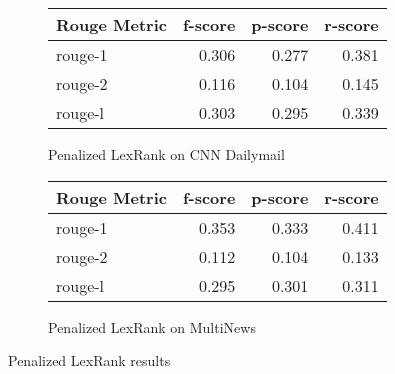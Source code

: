 \documentclass[../writeup.tex]{subfiles}
\begin{document}
\begin{figure}[H]
    \centering
    \begin{subfigure}{0.5\linewidth}
        \begin{tabular}{lrrr}
            \hline
            Rouge Metric & f-score & p-score & r-score \\
            \hline
            rouge-1      & 0.306   & 0.277   & 0.381   \\
            rouge-2      & 0.116   & 0.104   & 0.145   \\
            rouge-l      & 0.303   & 0.295   & 0.339   \\
            \hline
        \end{tabular}
        \caption{Penalized LexRank on CNN Dailymail}
    \end{subfigure}%
    \begin{subfigure}{0.5\linewidth}
        \begin{tabular}{lrrr}
            \hline
            Rouge Metric & f-score & p-score & r-score \\
            \hline
            rouge-1      & 0.353   & 0.333   & 0.411   \\
            rouge-2      & 0.112   & 0.104   & 0.133   \\
            rouge-l      & 0.295   & 0.301   & 0.311   \\
            \hline
        \end{tabular}
        \caption{Penalized LexRank on MultiNews}
    \end{subfigure}
    \caption{Penalized LexRank results}
    \label{appendix:fig:results:lexrank_full}
\end{figure}
\end{document}

